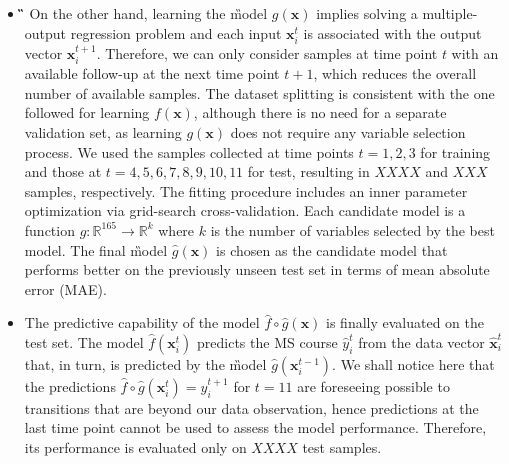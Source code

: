 \begin{itemize}
	\item[] \textbf{\G} %
	On the other hand, learning the \G model $g(\bm{x})$ implies solving a multiple-output regression problem and each input $\bm{x}_i^t$ is associated with the output vector $\bm{x}_i^{t+1}$.
	Therefore, we can only consider samples at time point $t$ with an available follow-up at the next time point $t+1$, which reduces the overall number of available samples.
	The dataset splitting is consistent with the one followed for learning $f(\bm{x})$, although there is no need for a separate validation set, as learning $g(\bm{x})$ does not require any variable selection process. We used the samples collected at time points $t=1,2,3$ for training and those at $t=4,5,6,7,8,9,10,11$ for test, resulting in $XXXX$ and $XXX$ samples, respectively.
	The fitting procedure includes an inner parameter optimization via grid-search cross-validation. Each candidate model is a function
	$g: \mathbb{R}^{165} \rightarrow \mathbb{R}^k$ where $k$ is the number of variables selected by the best \F model.
	The final \G model $\hat{g}(\bm{x})$ is chosen as the candidate model that performs better on the previously unseen test set in terms of mean absolute error (MAE).
	

	\item[] \textbf{\FOG} The predictive capability of the \FOG model $\hat{f} \circ \hat{g}(\bm{x})$ is finally evaluated on the test set. The \F model $\hat{f}(\bm{x}_i^t)$ predicts the MS course $\hat{y}_i^t$ from the \PCO data vector $\hat{\bm{x}}_i^t$ that, in turn, is predicted by the \G model $\hat{g}(\bm{x}_i^{t-1})$. We shall notice here that the predictions $\hat{f} \circ \hat{g}(\bm{x}_i^t)=y_i^{t+1}$ for $t=11$ are foreseeing possible \RR to \SP transitions that are beyond our data observation, hence predictions at the last time point cannot be used to assess the \FOG model performance. Therefore, its performance is evaluated only on $XXXX$ test samples.
	
\end{itemize}







